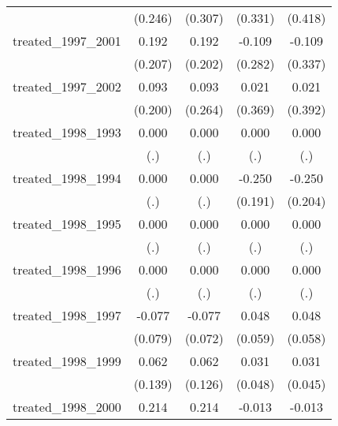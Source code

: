 {\begin{tabular}{l*{4}{c}}
            &     (0.246)         &     (0.307)         &     (0.331)         &     (0.418)         \\
[1em]
treated\_1997\_2001&       0.192         &       0.192         &      -0.109         &      -0.109         \\
            &     (0.207)         &     (0.202)         &     (0.282)         &     (0.337)         \\
[1em]
treated\_1997\_2002&       0.093         &       0.093         &       0.021         &       0.021         \\
            &     (0.200)         &     (0.264)         &     (0.369)         &     (0.392)         \\
[1em]
treated\_1998\_1993&       0.000         &       0.000         &       0.000         &       0.000         \\
            &         (.)         &         (.)         &         (.)         &         (.)         \\
[1em]
treated\_1998\_1994&       0.000         &       0.000         &      -0.250         &      -0.250         \\
            &         (.)         &         (.)         &     (0.191)         &     (0.204)         \\
[1em]
treated\_1998\_1995&       0.000         &       0.000         &       0.000         &       0.000         \\
            &         (.)         &         (.)         &         (.)         &         (.)         \\
[1em]
treated\_1998\_1996&       0.000         &       0.000         &       0.000         &       0.000         \\
            &         (.)         &         (.)         &         (.)         &         (.)         \\
[1em]
treated\_1998\_1997&      -0.077         &      -0.077         &       0.048         &       0.048         \\
            &     (0.079)         &     (0.072)         &     (0.059)         &     (0.058)         \\
[1em]
treated\_1998\_1999&       0.062         &       0.062         &       0.031         &       0.031         \\
            &     (0.139)         &     (0.126)         &     (0.048)         &     (0.045)         \\
[1em]
treated\_1998\_2000&       0.214         &       0.214         &      -0.013         &      -0.013         \\

\end{tabular}}
